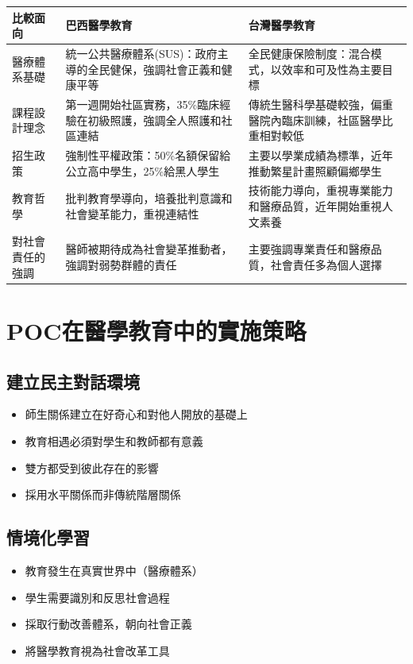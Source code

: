\documentclass[12pt,a4paper]{article}
\begin{document}
\begin{longtable}{p{4cm}|p{5.5cm}|p{5.5cm}}
    \toprule
    \textbf{比較面向} & \textbf{巴西醫學教育} & \textbf{台灣醫學教育} \\
    \midrule
    \endhead
    醫療體系基礎 & 
    統一公共醫療體系(SUS)：政府主導的全民健保，強調社會正義和健康平等 & 
    全民健康保險制度：混合模式，以效率和可及性為主要目標 \\
    \midrule
    課程設計理念 & 
    第一週開始社區實務，35\%臨床經驗在初級照護，強調全人照護和社區連結 & 
    傳統生醫科學基礎較強，偏重醫院內臨床訓練，社區醫學比重相對較低 \\
    \midrule
    招生政策 & 
    強制性平權政策：50\%名額保留給公立高中學生，25\%給黑人學生 & 
    主要以學業成績為標準，近年推動繁星計畫照顧偏鄉學生 \\
    \midrule
    教育哲學 & 
    批判教育學導向，培養批判意識和社會變革能力，重視連結性 & 
    技術能力導向，重視專業能力和醫療品質，近年開始重視人文素養 \\
    \midrule
    對社會責任的強調 & 
    醫師被期待成為社會變革推動者，強調對弱勢群體的責任 & 
    主要強調專業責任和醫療品質，社會責任多為個人選擇 \\
    \bottomrule
\end{longtable}

\section{POC在醫學教育中的實施策略}

\subsection{建立民主對話環境}
\begin{itemize}[nosep]
    \item 師生關係建立在好奇心和對他人開放的基礎上
    \item 教育相遇必須對學生和教師都有意義
    \item 雙方都受到彼此存在的影響
    \item 採用水平關係而非傳統階層關係
\end{itemize}

\subsection{情境化學習}
\begin{itemize}[nosep]
    \item 教育發生在真實世界中（醫療體系）
    \item 學生需要識別和反思社會過程
    \item 採取行動改善體系，朝向社會正義
    \item 將醫學教育視為社會改革工具
\end{itemize}
\end{document}
